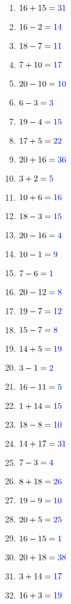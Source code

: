 \documentclass[11pt]{article}\usepackage[a4paper,margin=0.90in,tmargin=0.5in]{geometry}\usepackage{amsmath, amsthm, amssymb}
\begin{document}
\begin{multicols}{4}
\begin{enumerate}[itemsep=0.45\baselineskip]
\item $16 + 15 = { \color[rgb]{0,0,1} 31 }$ 
\item $16 - 2 = { \color[rgb]{0,0,1} 14 }$ 
\item $18 - 7 = { \color[rgb]{0,0,1} 11 }$ 
\item $7 + 10 = { \color[rgb]{0,0,1} 17 }$ 
\item $20 - 10 = { \color[rgb]{0,0,1} 10 }$ 
\item $6 - 3 = { \color[rgb]{0,0,1} 3 }$ 
\item $19 - 4 = { \color[rgb]{0,0,1} 15 }$ 
\item $17 + 5 = { \color[rgb]{0,0,1} 22 }$ 
\item $20 + 16 = { \color[rgb]{0,0,1} 36 }$ 
\item $3 + 2 = { \color[rgb]{0,0,1} 5 }$ 
\item $10 + 6 = { \color[rgb]{0,0,1} 16 }$ 
\item $18 - 3 = { \color[rgb]{0,0,1} 15 }$ 
\item $20 - 16 = { \color[rgb]{0,0,1} 4 }$ 
\item $10 - 1 = { \color[rgb]{0,0,1} 9 }$ 
\item $7 - 6 = { \color[rgb]{0,0,1} 1 }$ 
\item $20 - 12 = { \color[rgb]{0,0,1} 8 }$ 
\item $19 - 7 = { \color[rgb]{0,0,1} 12 }$ 
\item $15 - 7 = { \color[rgb]{0,0,1} 8 }$ 
\item $14 + 5 = { \color[rgb]{0,0,1} 19 }$ 
\item $3 - 1 = { \color[rgb]{0,0,1} 2 }$ 
\item $16 - 11 = { \color[rgb]{0,0,1} 5 }$ 
\item $1 + 14 = { \color[rgb]{0,0,1} 15 }$ 
\item $18 - 8 = { \color[rgb]{0,0,1} 10 }$ 
\item $14 + 17 = { \color[rgb]{0,0,1} 31 }$ 
\item $7 - 3 = { \color[rgb]{0,0,1} 4 }$ 
\item $8 + 18 = { \color[rgb]{0,0,1} 26 }$ 
\item $19 - 9 = { \color[rgb]{0,0,1} 10 }$ 
\item $20 + 5 = { \color[rgb]{0,0,1} 25 }$ 
\item $16 - 15 = { \color[rgb]{0,0,1} 1 }$ 
\item $20 + 18 = { \color[rgb]{0,0,1} 38 }$ 
\item $3 + 14 = { \color[rgb]{0,0,1} 17 }$ 
\item $16 + 3 = { \color[rgb]{0,0,1} 19 }$ 

\end{enumerate}
\end{multicols}
\end{document}
